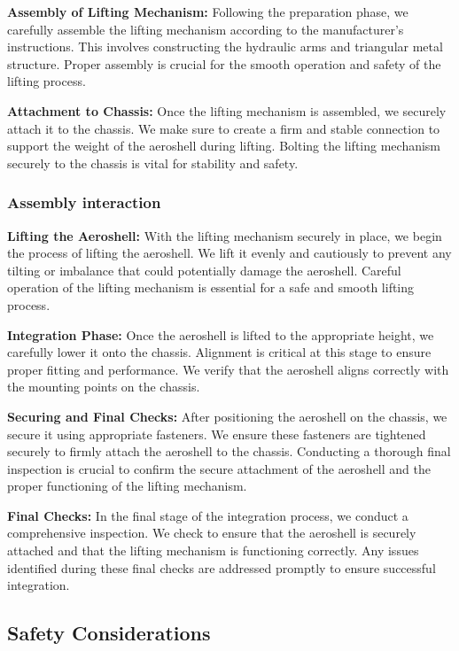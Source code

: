 \textbf{Assembly of Lifting Mechanism:} 
Following the preparation phase, we carefully assemble the lifting mechanism according to the manufacturer's instructions. This involves constructing the hydraulic arms and triangular metal structure. Proper assembly is crucial for the smooth operation and safety of the lifting process.

\textbf{Attachment to Chassis:} 
Once the lifting mechanism is assembled, we securely attach it to the chassis. We make sure to create a firm and stable connection to support the weight of the aeroshell during lifting. Bolting the lifting mechanism securely to the chassis is vital for stability and safety.
\subsubsection{Assembly interaction}
\textbf{Lifting the Aeroshell:} 
With the lifting mechanism securely in place, we begin the process of lifting the aeroshell. We lift it evenly and cautiously to prevent any tilting or imbalance that could potentially damage the aeroshell. Careful operation of the lifting mechanism is essential for a safe and smooth lifting process.

\textbf{Integration Phase:} 
Once the aeroshell is lifted to the appropriate height, we carefully lower it onto the chassis. Alignment is critical at this stage to ensure proper fitting and performance. We verify that the aeroshell aligns correctly with the mounting points on the chassis.

\textbf{Securing and Final Checks:} 
After positioning the aeroshell on the chassis, we secure it using appropriate fasteners. We ensure these fasteners are tightened securely to firmly attach the aeroshell to the chassis. Conducting a thorough final inspection is crucial to confirm the secure attachment of the aeroshell and the proper functioning of the lifting mechanism.

\textbf{Final Checks:} 
In the final stage of the integration process, we conduct a comprehensive inspection. We check to ensure that the aeroshell is securely attached and that the lifting mechanism is functioning correctly. Any issues identified during these final checks are addressed promptly to ensure successful integration.



\subsection{Safety Considerations}
